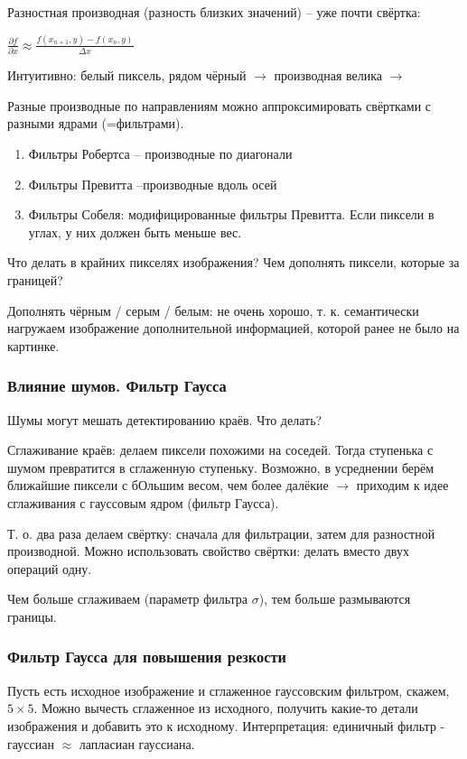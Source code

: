 \documentclass[main.tex]{subfiles}
\begin{document}
Разностная производная (разность близких значений) -- уже почти свёртка:

$ \frac{\partial f}{\partial x} \approx \frac{f(x_{n+1},y) - f(x_n,y)}{\Delta x} $

Интуитивно: белый пиксель, рядом чёрный $ \to $ производная велика $\to $

Разные производные по направлениям можно аппроксимировать свёртками с разными ядрами (=фильтрами).

\begin{enumerate}[noitemsep]
	\item Фильтры Робертса -- производные по диагонали
	\item Фильтры Превитта --производные вдоль осей
	\item Фильтры Собеля: модифицированные фильтры Превитта. Если пиксели в углах, у них должен быть меньше вес.
\end{enumerate}

Что делать в крайних пикселях изображения? Чем дополнять пиксели, которые за границей?

Дополнять чёрным / серым / белым: не очень хорошо, т. к. семантически нагружаем изображение дополнительной информацией, которой ранее не было на картинке.

\subsubsection{Влияние шумов. Фильтр Гаусса}

Шумы могут мешать детектированию краёв.
Что делать?

Сглаживание краёв: делаем пиксели похожими на соседей. Тогда ступенька с шумом превратится в сглаженную ступеньку.
Возможно, в усреднении берём ближайшие пиксели с бОльшим весом, чем более далёкие $ \to $ приходим к идее сглаживания с гауссовым ядром (фильтр Гаусса).

Т. о. два раза делаем свёртку: сначала для фильтрации, затем для разностной производной.
Можно использовать свойство свёртки: делать вместо двух операций одну.

Чем больше сглаживаем (параметр фильтра $ \sigma $), тем больше размываются границы.

\subsubsection{Фильтр Гаусса для повышения резкости}

Пусть есть исходное изображение и сглаженное гауссовским фильтром, скажем, $ 5 \times 5 $.
Можно вычесть сглаженное из исходного, получить какие-то детали изображения и добавить это к исходному.
Интерпретация: единичный фильтр - гауссиан $ \approx $ лапласиан гауссиана.
\end{document}
